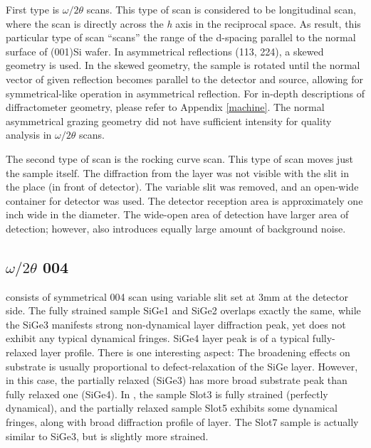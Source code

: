 

First type is $\omega/2\theta$ scans.  This type of scan is considered to be longitudinal scan, where the scan is directly across the \emph{h} axis in the reciprocal space.  As result, this particular type of scan ``scans'' the range of the d-spacing parallel to the normal surface of (001)Si wafer.  In asymmetrical reflections (113, 224), a skewed geometry is used.  In the skewed geometry, the sample is rotated until the normal vector of given reflection becomes parallel to the detector and source, allowing for symmetrical-like operation in asymmetrical reflection.  For in-depth descriptions of diffractometer geometry, please refer to Appendix \ref{machine}.  The normal asymmetrical grazing geometry did not have sufficient intensity for quality analysis in $\omega/2\theta$ scans.

The second type of scan is the rocking curve scan.  This type of scan moves just the sample itself.  The diffraction from the layer was not visible with the slit in the place (in front of detector).  The variable slit was removed, and an open-wide container for detector was used.  The detector reception area is approximately one inch wide in the diameter.  The wide-open area of detection have larger area of detection; however, also introduces equally large amount of background noise.


\subsection{$\omega/2\theta$ 004}
 consists of symmetrical 004 scan using variable slit set at 3mm at the detector side.  The fully strained sample SiGe1 and SiGe2 overlaps exactly the same, while the SiGe3 manifests strong non-dynamical layer diffraction peak, yet does not exhibit any typical dynamical fringes.  SiGe4 layer peak is of a typical fully-relaxed layer profile.  There is one interesting aspect:  The broadening effects on substrate is usually proportional to  defect-relaxation of the SiGe layer.  However, in this case, the partially relaxed (SiGe3) has more broad substrate peak than fully relaxed one (SiGe4). In , the sample Slot3 is fully strained (perfectly dynamical), and the partially relaxed sample Slot5 exhibits some dynamical fringes, along with broad diffraction profile of layer.  The Slot7 sample is actually similar to SiGe3, but is slightly more strained.

